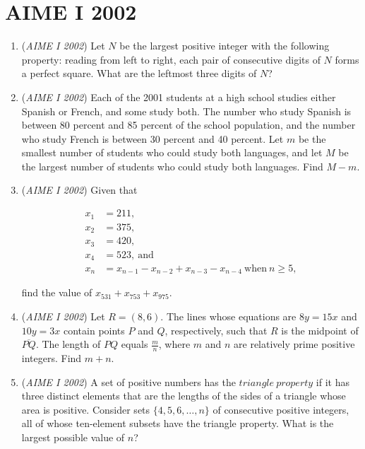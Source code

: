 \section{AIME I 2002}
        \begin{enumerate}
        	\item (\textit{AIME I 2002}) Let $N$ be the largest positive integer with the following property: reading from left to right, each pair of consecutive digits of $N$ forms a perfect square. What are the leftmost three digits of $N$?


 

	\item (\textit{AIME I 2002}) Each of the 2001 students at a high school studies either Spanish or French, and some study both. The number who study Spanish is between 80 percent and 85 percent of the school population, and the number who study French is between 30 percent and 40 percent. Let $m$ be the smallest number of students who could study both languages, and let $M$ be the largest number of students who could study both languages. Find $M-m$. 


 

	\item (\textit{AIME I 2002}) Given that

 \begin{align*}x_{1}&=211,\\ x_{2}&=375,\\ x_{3}&=420,\\ x_{4}&=523,\ \text{and}\\ x_{n}&=x_{n-1}-x_{n-2}+x_{n-3}-x_{n-4}\ \text{when}\ n\geq5, \end{align*}

find the value of $x_{531}+x_{753}+x_{975}$.


 

	\item (\textit{AIME I 2002}) Let $R = (8,6)$. The lines whose equations are $8y = 15x$ and $10y = 3x$ contain points $P$ and $Q$, respectively, such that $R$ is the midpoint of $\overline{PQ}$. The length of $PQ$ equals $\frac {m}{n}$, where $m$ and $n$ are relatively prime positive integers. Find $m + n$.


 

	\item (\textit{AIME I 2002}) A set of positive numbers has the $triangle~property$ if it has three distinct elements that are the lengths of the sides of a triangle whose area is positive. Consider sets $\{4, 5, 6, \ldots, n\}$ of consecutive positive integers, all of whose ten-element subsets have the triangle property. What is the largest possible value of $n$?



\end{enumerate}
